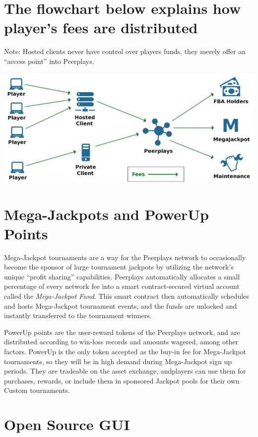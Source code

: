 \documentclass[a4paper,titlepage,final]{article}
\begin{document}
\section{The flowchart below explains how player’s fees are distributed }

Note: Hosted clients never have control over players funds, they merely offer an “access point” into Peerplays.

\begin{center}
\includegraphics[width=\textwidth]{fig/flowchart}
\end{center}

\section{Mega-Jackpots and PowerUp Points}

Mega-Jackpot tournaments are a way for the Peerplays network to occasionally become the sponsor of large tournament jackpots by utilizing the network’s unique “profit sharing” capabilities. Peerplays automatically allocates a small percentage of every network fee into a smart contract-secured virtual account called the \textit{​Mega-Jackpot Fund}. This smart contract then automatically schedules and hosts Mega-Jackpot tournament events, and the funds are unlocked and instantly transferred to the tournament winners. 

PowerUp points are the user-reward tokens of the Peerplays network, and are distributed according to win-loss records and amounts wagered, among other factors. PowerUp is the only token accepted as the buy-in fee for Mega-Jackpot tournaments, so they will be in high demand during Mega-Jackpot sign up periods. They are tradeable on the asset exchange, andplayers can use them for purchases, rewards, or include them in sponsored Jackpot pools for their own Custom tournaments.

\section{Open Source GUI}
\end{document}
